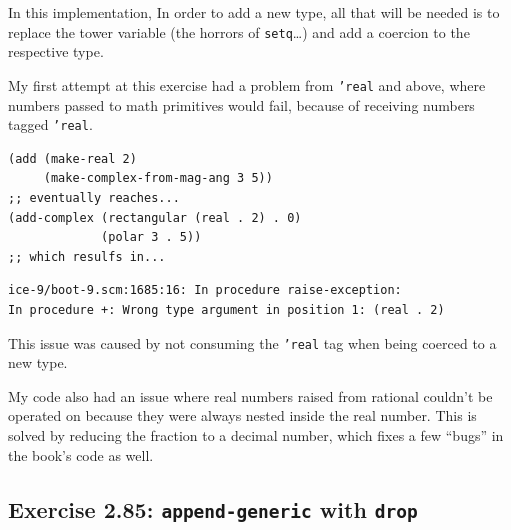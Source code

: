 \documentclass[final,fleqn,titlepage,twoside]{article}
\begin{document}
In this implementation, In order to add a new type, all that will be needed is
to replace the tower variable (the horrors of \texttt{setq}\ldots{}) and add a coercion to
the respective type.

My first attempt at this exercise had a problem from \texttt{'real} and above,
where numbers passed to math primitives would fail, because of receiving numbers tagged
\texttt{'real}.

\begin{verbatim}
(add (make-real 2)
     (make-complex-from-mag-ang 3 5))
;; eventually reaches...
(add-complex (rectangular (real . 2) . 0)
             (polar 3 . 5))
;; which resulfs in...
\end{verbatim}

\begin{verbatim}
ice-9/boot-9.scm:1685:16: In procedure raise-exception:
In procedure +: Wrong type argument in position 1: (real . 2)
\end{verbatim}

This issue was caused by not consuming the \texttt{'real} tag when being
coerced to a new type.

My code also had an issue where real numbers raised from rational couldn't be
operated on because they were always nested inside the real number. This is
solved by reducing the fraction to a decimal number, which fixes a few ``bugs'' in
the book's code as well.

\subsection{Exercise 2.85: \texttt{append-generic} with \texttt{drop}}
\label{sec:org91711e7}
\end{document}
